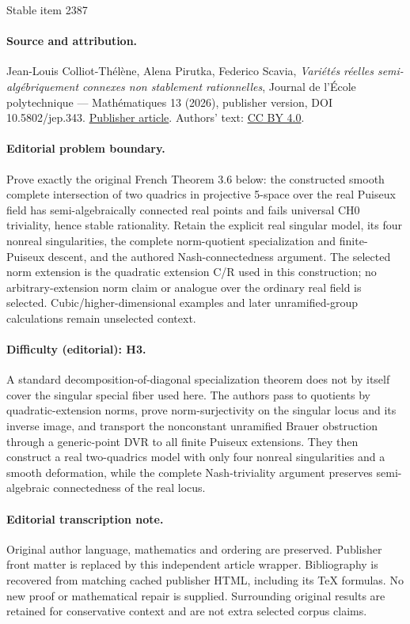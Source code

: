 \documentclass[11pt]{article}
\theoremstyle{definition}
\begin{document}
\begin{center}{\Large Stable item 2387}\end{center}
\paragraph{Source and attribution.}
Jean-Louis Colliot-Thélène, Alena Pirutka, Federico Scavia, \emph{Variétés réelles semi-algébriquement connexes non stablement rationnelles}, Journal de l’École polytechnique — Mathématiques 13 (2026), publisher version, DOI 10.5802/jep.343. \href{https://jep.centre-mersenne.org/articles/10.5802/jep.343/}{Publisher article}. Authors' text: \href{https://creativecommons.org/licenses/by/4.0/}{CC BY 4.0}.
\paragraph{Editorial problem boundary.}
Prove exactly the original French Theorem 3.6 below: the constructed smooth complete intersection of two quadrics in projective 5-space over the real Puiseux field has semi-algebraically connected real points and fails universal CH0 triviality, hence stable rationality. Retain the explicit real singular model, its four nonreal singularities, the complete norm-quotient specialization and finite-Puiseux descent, and the authored Nash-connectedness argument. The selected norm extension is the quadratic extension C/R used in this construction; no arbitrary-extension norm claim or analogue over the ordinary real field is selected. Cubic/higher-dimensional examples and later unramified-group calculations remain unselected context.
\paragraph{Difficulty (editorial): H3.}
A standard decomposition-of-diagonal specialization theorem does not by itself cover the singular special fiber used here. The authors pass to quotients by quadratic-extension norms, prove norm-surjectivity on the singular locus and its inverse image, and transport the nonconstant unramified Brauer obstruction through a generic-point DVR to all finite Puiseux extensions. They then construct a real two-quadrics model with only four nonreal singularities and a smooth deformation, while the complete Nash-triviality argument preserves semi-algebraic connectedness of the real locus.
\paragraph{Editorial transcription note.}
Original author language, mathematics and ordering are preserved. Publisher front matter is replaced by this independent article wrapper. Bibliography is recovered from matching cached publisher HTML, including its TeX formulas. No new proof or mathematical repair is supplied. Surrounding original results are retained for conservative context and are not extra selected corpus claims.
\clearpage
\end{document}
